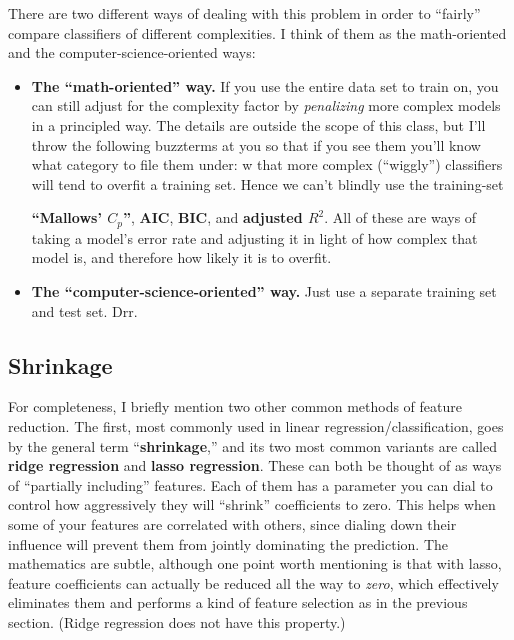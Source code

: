 \documentclass[12pt]{article}
\begin{document}
There are two different ways of dealing with this problem in order to
``fairly'' compare classifiers of different complexities. I think of them as
the math-oriented and the computer-science-oriented ways:

\begin{itemize}
\itemsep.1em

\item \textbf{The ``math-oriented'' way.} If you use the entire data set to
train on, you can still adjust for the complexity factor by
\textit{penalizing} more complex models in a principled way. The details are
outside the scope of this class, but I'll throw the following buzzterms at you
so that if you see them you'll know what category to file them under:
w that more complex (``wiggly'')
classifiers will tend to overfit a training set. Hence we can't blindly use
the training-set 

\textbf{``Mallows' $C_p$''}, \textbf{AIC}, \textbf{BIC}, and \textbf{adjusted
$R^2$}. All of these are ways of taking a model's error rate and adjusting it
in light of how complex that model is, and therefore how likely it is to
overfit.

\item \textbf{The ``computer-science-oriented'' way.} Just use a separate
training set and test set. Drr.

\end{itemize}

\small
\subsection{Shrinkage}

For completeness, I briefly mention two other common methods of feature
reduction. The first, most commonly used in linear regression/classification,
goes by the general term ``\textbf{shrinkage},'' and its two most common
variants are called \textbf{ridge regression} and \textbf{lasso regression}.
These can both be thought of as ways of ``partially including'' features. Each
of them has a parameter you can dial to control how aggressively they will
``shrink'' coefficients to zero. This helps when some of your features are
correlated with others, since dialing down their influence will prevent them
from jointly dominating the prediction. The mathematics are subtle, although
one point worth mentioning is that with lasso, feature coefficients can
actually be reduced all the way to \textit{zero}, which effectively eliminates
them and performs a kind of feature selection as in the previous section.
(Ridge regression does not have this property.)
\end{document}
